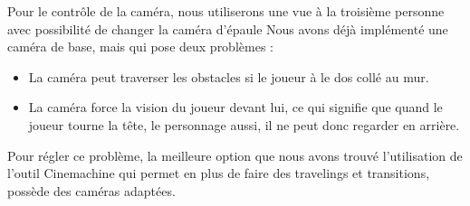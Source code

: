 \documentclass[../doc.tex]{subfiles}
\begin{document}
            Pour le contrôle de la caméra, nous utiliserons une vue à la troisième personne
            avec possibilité de changer la caméra d'épaule
            Nous avons déjà implémenté une caméra de base, mais qui pose deux problèmes :
            \begin{itemize}
                \item La caméra peut traverser les obstacles si le joueur à le dos collé au mur.
                \item La caméra force la vision du joueur devant lui, ce qui signifie que quand le joueur tourne la tête, le personnage aussi, il ne peut donc regarder en arrière. 
            \end{itemize}
            
            Pour régler ce problème, la meilleure option que nous avons trouvé l'utilisation de l'outil Cinemachine qui permet en plus de faire des travelings et transitions, possède des caméras adaptées.
\end{document}
